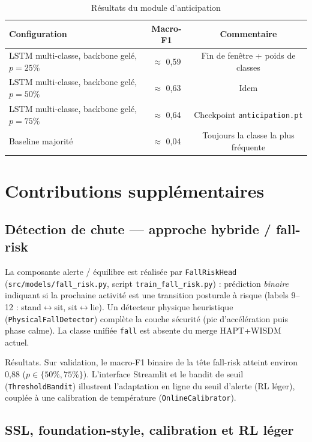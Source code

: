 \documentclass[a4paper,12pt]{report}
\begin{document}
\begin{table}[H]
\centering
\small
\begin{tabularx}{0.88\textwidth}{|Y|c|c|}
\hline
\textbf{Configuration} & \textbf{Macro-F1} & \textbf{Commentaire} \\
\hline
LSTM multi-classe, backbone gelé, $p=25\%$ & $\approx$ 0,59 & Fin de fenêtre + poids de classes \\
LSTM multi-classe, backbone gelé, $p=50\%$ & $\approx$ 0,63 & Idem \\
LSTM multi-classe, backbone gelé, $p=75\%$ & $\approx$ 0,64 & Checkpoint \texttt{anticipation.pt} \\
Baseline majorité & $\approx$ 0,04 & Toujours la classe la plus fréquente \\
\hline
\end{tabularx}
\caption{Résultats du module d'anticipation}
\label{tab:anticipation_impl}
\end{table}
\section{Contributions supplémentaires}

\subsection{Détection de chute — approche hybride / fall-risk}

La composante alerte / équilibre est réalisée par \texttt{FallRiskHead}
(\texttt{src/models/fall\_risk.py}, script \texttt{train\_fall\_risk.py}) :
prédiction \emph{binaire} indiquant si la prochaine activité est une transition
posturale à risque (labels 9--12 : stand$\leftrightarrow$sit, sit$\leftrightarrow$lie).
Un détecteur physique heuristique (\texttt{PhysicalFallDetector}) complète la
couche sécurité (pic d'accélération puis phase calme). La classe unifiée
\texttt{fall} est absente du merge HAPT+WISDM actuel.

Résultats. Sur validation, le macro-F1 binaire de la tête fall-risk atteint
environ 0,88 ($p\in\{50\%,75\%\}$). L'interface Streamlit et le bandit de
seuil (\texttt{ThresholdBandit}) illustrent l'adaptation en ligne du seuil
d'alerte (RL léger), couplée à une calibration de température
(\texttt{OnlineCalibrator}).

\subsection{SSL, foundation-style, calibration et RL léger}
\end{document}
